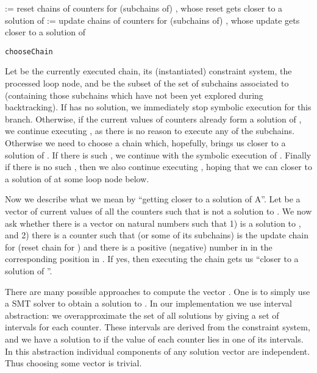 \documentclass{llncs}
\begin{document}
\begin{algorithm}
\dontprintsemicolon
{}
 := reset chains of counters for (subchains of) , whose reset gets closer to a solution of \;
 := update chains of counters for (subchains of) , whose update gets closer to a solution of \;
\;
\BlankLine
\caption{\texttt{chooseChain}}
\label{alg:chooseChain}
\end{algorithm}

Let  be the currently executed chain,  its (instantiated) constraint
system,  the processed loop node, and  be the
subset of the set of subchains associated to  (containing those subchains
which have not been yet explored during backtracking). If  has no
solution, we immediately stop symbolic execution for this branch. Otherwise,
if the current values of counters already form a solution of , we continue executing
, as there is no reason to execute any of the subchains. Otherwise we need to choose a chain
 which, hopefully, brings us closer to a solution of . If there
is such , we continue with the symbolic execution of . Finally if there
is no such , then we also continue executing , hoping that we can closer to
a solution of  at some loop node below.

Now we describe what we mean by ``getting closer to a solution of A''. Let
 be a vector of current values of all the counters such that
 is not a solution to . We now ask whether there is a vector
 on natural numbers such that 1)  is a solution to
, and 2) there is a counter  such that  (or some of its
subchains) is the update chain for  (reset chain for ) and
there is a positive (negative) number in in the corresponding position in
. If yes, then executing the chain  gets us ``closer to a
solution of ''.

There are many possible approaches to compute the vector . One is
to simply use a SMT solver to obtain a solution to . In our
implementation we use interval abstraction: we overapproximate the set of
all solutions by giving a
set of intervals for each counter. These intervals are derived from
the constraint system, and we have a solution to  if the value of each counter
lies in one of its intervals. In this abstraction individual components of
any solution vector are independent. Thus choosing some vector  is
trivial.
\end{document}
